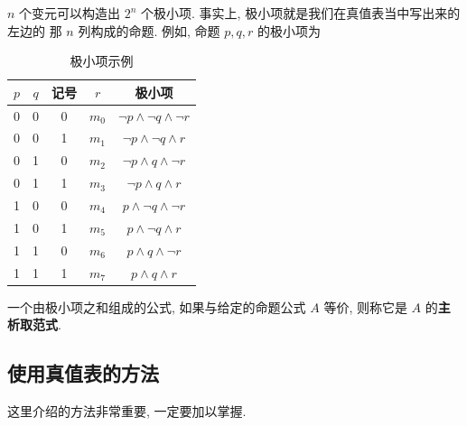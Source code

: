 \documentclass[10pt,UTF8]{book} %
\begin{document}
$n$ 个变元可以构造出 $2^n$ 个极小项. 事实上, 极小项就是我们在真值表当中写出来的左边的
那 $n$ 列构成的命题. 例如, 命题 $p,q,r$ 的极小项为
\begin{table}[H]
    \centering
    \caption{极小项示例}
    \begin{tabular}{ccccc}
        \hline 
        $p$ & $q$ & 记号 & $r$ & 极小项 \\ 
        \hline
        0 & 0 & 0 & $m_0$ & $\lnot p \wedge \lnot q \wedge \lnot r$ \\ 
        0 & 0 & 1 & $m_1$ & $\lnot p \wedge \lnot q \wedge  r$\\ 
        0 & 1 & 0 & $m_2$ & $\lnot p \wedge  q \wedge \lnot r$\\ 
        0 & 1 & 1 & $m_3$ & $\lnot p \wedge  q \wedge  r$\\ 
        1 & 0 & 0 & $m_4$ & $ p \wedge \lnot q \wedge \lnot r$\\ 
        1 & 0 & 1 & $m_5$ & $ p \wedge \lnot q \wedge  r$\\ 
        1 & 1 & 0 & $m_6$ & $ p \wedge  q \wedge \lnot r$\\ 
        1 & 1 & 1 & $m_7$ & $ p \wedge  q \wedge  r$\\
        \hline
    \end{tabular}
\end{table}

\begin{definition}
    一个由极小项之和组成的公式, 如果与给定的命题公式 $A$ 等价, 则称它是 $A$ 的\textbf{主析取范式}.
\end{definition}


\subsection{使用真值表的方法}

这里介绍的方法非常重要, 一定要加以掌握.
\end{document}
